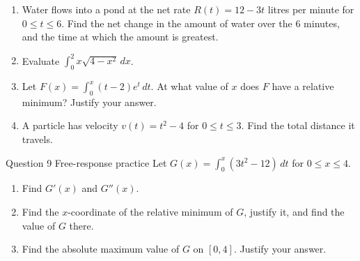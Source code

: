 \documentclass[11pt]{article}
\begin{document}
\begin{enumerate}[leftmargin=*,itemsep=2pt,start=5]
  \item Water flows into a pond at the net rate $R(t)=12-3t$ litres per minute for $0\le t\le6$. Find the net change in the amount of water over the 6 minutes, and the time at which the amount is greatest.\work{2.8cm}
  \item Evaluate $\displaystyle\int_{0}^{2}x\sqrt{4-x^2}\,dx$.\work{2.8cm}
  \item Let $F(x)=\displaystyle\int_{0}^{x}(t-2)e^{t}\,dt$. At what value of $x$ does $F$ have a relative minimum? Justify your answer.\work{2.8cm}
  \item A particle has velocity $v(t)=t^2-4$ for $0\le t\le3$. Find the total distance it travels.\work{2.8cm}
\end{enumerate}

\begin{frbox}{Question 9 \textperiodcentered{} Free-response practice}
Let $G(x)=\displaystyle\int_{0}^{x}\left(3t^2-12\right)\,dt$ for $0\le x\le4$.
\begin{enumerate}[label=(\alph*),leftmargin=*,itemsep=2pt]
  \item Find $G'(x)$ and $G''(x)$.\work{2.6cm}
  \item Find the $x$-coordinate of the relative minimum of $G$, justify it, and find the value of $G$ there.\work{2.6cm}
  \item Find the absolute maximum value of $G$ on $[0,4]$. Justify your answer.\work{2.6cm}
\end{enumerate}
\end{frbox}
\end{document}

